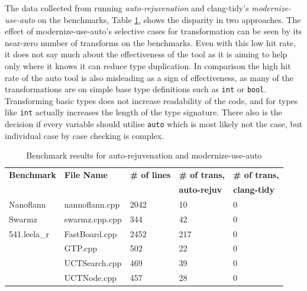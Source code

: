 \documentclass[bsc,frontabs,singlespacing,twoside,parskip,deptreport]{infthesis}
\begin{document}
 
The data collected from running \textit{auto-rejuvenation} and clang-tidy's \textit{modernize-use-auto} on the benchmarks, Table \ref{tab:auto-tool-benchmark-res}, shows the disparity in two approaches. The effect of modernize-use-auto's selective cases for transformation can be seen by its near-zero number of transforms on the benchmarks. Even with this low hit rate, it does not say much about the effectiveness of the tool as it is aiming to help only where it knows it can reduce type duplication. In comparison the high hit rate of the auto tool is also misleading as a sign of effectiveness, as many of the transformations are on simple base type definitions such as \texttt{int} or \texttt{bool}. Transforming basic types does not increase readability of the code, and for types like \texttt{int} actually increases the length of the type signature. There also is the decision if every variable should utilise \texttt{auto} which is most likely not the case, but individual case by case checking is complex.


\begin{table}[H]
    \begin{center}
        \begin{tabular}{| l | l | l | l | l |}
            \hline
            \textbf{Benchmark}    & \textbf{File Name}    & \textbf{\# of lines}  & \textbf{\# of trans,} & \textbf{\# of trans,} \\ 
                                  &                       &                       & \textbf{auto-rejuv}   & \textbf{clang-tidy}   \\ \hline
            Nanoflann    & nannoflann.cpp   & 2042  & 10  & 0\\ \hline
            Swarmz       & swarmz.cpp.cpp   & 344   & 42  & 0\\ \hline
            541.leela\_r & FastBoard.cpp    & 2452    & 217 & 0\\ \hline
                         & GTP.cpp          & 502    & 22  & 0\\ \hline
                         & UCTSearch.cpp    & 469   & 39  & 0\\ \hline
                         & UCTNode.cpp        & 457   & 28  & 0\\ \hline
        \end{tabular}
        \caption{Benchmark results for auto-rejuvenation and modernize-use-auto}
        \label{tab:auto-tool-benchmark-res}
    \end{center}
\end{table}
\end{document}
